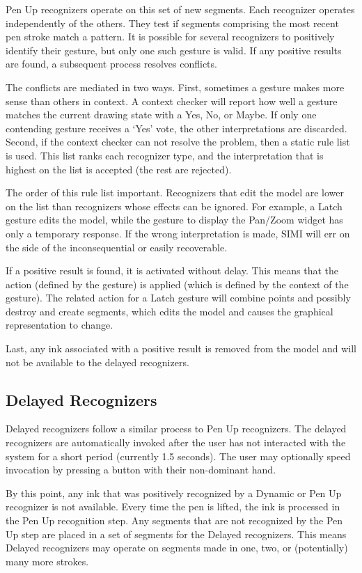 Pen Up recognizers operate on this set of new segments. Each
recognizer operates independently of the others. They test if segments
comprising the most recent pen stroke match a pattern. It is possible
for several recognizers to positively identify their gesture, but only
one such gesture is valid. If any positive results are found, a
subsequent process resolves conflicts.

The conflicts are mediated in two ways. First, sometimes a gesture
makes more sense than others in context. A context checker will report
how well a gesture matches the current drawing state with a Yes, No,
or Maybe. If only one contending gesture receives a `Yes' vote, the
other interpretations are discarded. Second, if the context checker
can not resolve the problem, then a static rule list is used. This
list ranks each recognizer type, and the interpretation that is
highest on the list is accepted (the rest are rejected).  

The order of this rule list important. Recognizers that edit the model
are lower on the list than recognizers whose effects can be
ignored. For example, a Latch gesture edits the model, while the
gesture to display the Pan/Zoom widget has only a temporary
response. If the wrong interpretation is made, SIMI will err on the
side of the inconsequential or easily recoverable.

If a positive result is found, it is activated without delay. This
means that the action (defined by the gesture) is applied (which is
defined by the context of the gesture). The related action for a Latch
gesture will combine points and possibly destroy and create segments,
which edits the model and causes the graphical representation to
change.

Last, any ink associated with a positive result is removed from the
model and will not be available to the delayed recognizers.

\subsection{Delayed Recognizers}

Delayed recognizers follow a similar process to Pen Up
recognizers. The delayed recognizers are automatically invoked after
the user has not interacted with the system for a short period
(currently 1.5 seconds). The user may optionally speed invocation by
pressing a button with their non-dominant hand.

By this point, any ink that was positively recognized by a Dynamic or
Pen Up recognizer is not available. Every time the pen is lifted, the
ink is processed in the Pen Up recognition step. Any segments that are
not recognized by the Pen Up step are placed in a set of segments for
the Delayed recognizers. This means Delayed recognizers may operate on
segments made in one, two, or (potentially) many more strokes.

